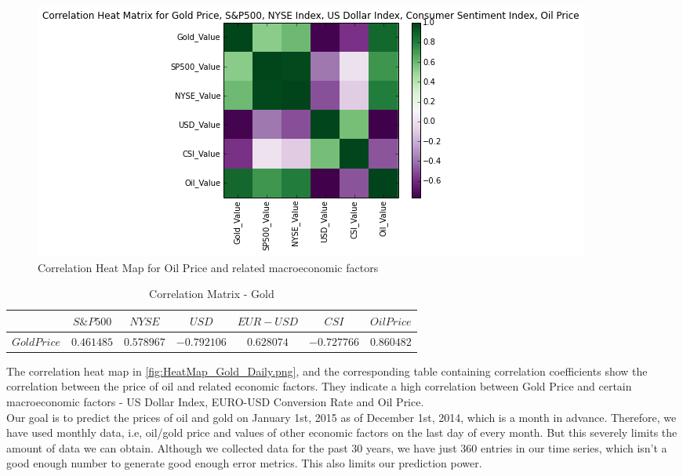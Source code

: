 \documentclass[runningheads]{llncs}
\begin{document}
\begin{figure}
\centering
\includegraphics[width=\textwidth]{HeatMap_Gold_Monthly.png}
\caption{Correlation Heat Map for Oil Price and related macroeconomic factors}
\label{fig:HeatMap_Gold_Daily.png}
\end{figure}

\begin{table}
\begin{center}
\begin{tabular}{|c|c|c|c|c|c|c|}
\hline
$ $ & $ S\&P 500 $ & $ NYSE $ & $ USD $ & $EUR-USD$ & $CSI$ &$Oil Price$ \\  \hline
$Gold Price$ & $0.461485$ & $0.578967$ & $-0.792106$ & $0.628074$ & $-0.727766$ & $0.860482$ \\ \hline
\end{tabular}
\end{center}
\caption{Correlation Matrix - Gold}
\end{table}

The correlation heat map in \autoref{fig:HeatMap_Gold_Daily.png}, and the corresponding table containing correlation coefficients show the correlation between the price of oil and related economic factors. They indicate a high correlation between Gold Price and certain macroeconomic factors - US Dollar Index, EURO-USD Conversion Rate and Oil Price.\\

\noindent Our goal is to predict the prices of oil and gold on January 1st, 2015 as of December 1st, 2014, which is a month in advance. Therefore, we have used monthly data, i.e, oil/gold price and values of other economic factors on the last day of every month. But this severely limits the amount of data we can obtain. Although we collected data for the past 30 years, we have just 360 entries in our time series, which isn't a good enough number to generate good enough error metrics. This also limits our prediction power. \\
\end{document}

